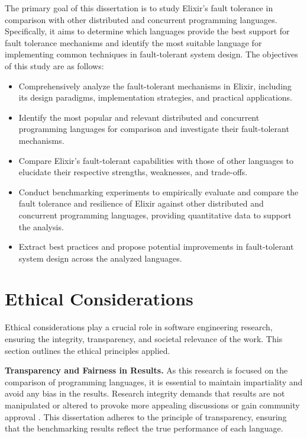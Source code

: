 The primary goal of this dissertation is to study Elixir’s fault tolerance in comparison with other distributed and concurrent programming languages. Specifically, it aims to determine which languages provide the best support for fault tolerance mechanisms and identify the most suitable language for implementing common techniques in fault-tolerant system design. The objectives of this study are as follows:

\begin{itemize}
    \item Comprehensively analyze the fault-tolerant mechanisms in Elixir, including its design paradigms, implementation strategies, and practical applications.
    \item Identify the most popular and relevant distributed and concurrent programming languages for comparison and investigate their fault-tolerant mechanisms.
    \item Compare Elixir’s fault-tolerant capabilities with those of other languages to elucidate their respective strengths, weaknesses, and trade-offs.
    \item Conduct benchmarking experiments to empirically evaluate and compare the fault tolerance and resilience of Elixir against other distributed and concurrent programming languages, providing quantitative data to support the analysis.
    \item Extract best practices and propose potential improvements in fault-tolerant system design across the analyzed languages.
\end{itemize}

\section{Ethical Considerations}

Ethical considerations play a crucial role in software engineering research, ensuring the integrity, transparency, and societal relevance of the work. This section outlines the ethical principles applied.

\textbf{Transparency and Fairness in Results.} As this research is focused on the comparison of programming languages, it is essential to maintain impartiality and avoid any bias in the results. Research integrity demands that results are not manipulated or altered to provoke more appealing discussions or gain community approval \cite{EthicDeb2018}. This dissertation adheres to the principle of transparency, ensuring that the benchmarking results reflect the true performance of each language.

